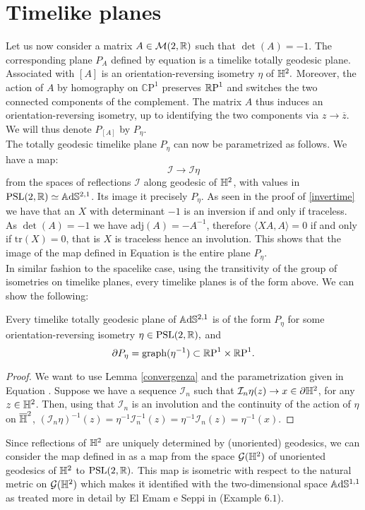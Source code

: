 \section{Timelike planes}
Let us now consider a matrix $A\in\mathcal{M}(2,\R)$ such that $\det(A)=-1.$ The corresponding plane $P_A$ defined by equation  is a timelike totally geodesic plane. Associated with $[A]$ is an orientation-reversing isometry $\eta$ of $\H^2.$ Moreover, the action of $A$ by homography on $\mathbb{C}\text{P}^1$ preserves $\S$ and switches the two connected components of the complement. The matrix $A$ thus induces an orientation-reversing isometry, up to identifying the two components via $z\to\overline{z}$. We will thus denote $P_{[A]}$ by $P_\eta$. \\
The totally geodesic timelike plane $P_\eta$ can now be parametrized as follows. We have a map: 
\begin{equation}\label{refspa}
    \mathcal{I}\to\mathcal{I}\eta
\end{equation}
from the spaces of reflections $\mathcal{I}$ along geodesic of $\H^2$, with values in $\PSL\simeq\A^{2,1}$. Its image it precisely $P_\eta.$ As seen in the proof of \ref{invertime} we have that an $X$ with determinant $-1$ is an inversion if and only if traceless. As $\det(A)=-1$ we have $\text{adj}(A)=-A^{-1}$, therefore $\langle XA,A\rangle=0$ if and only if $\text{tr}(X)=0$, that is $X$ is traceless hence an involution. This shows that the image of the map defined in Equation  is the entire plane $P_\eta$.\\  
In similar fashion to the spacelike case, using the transitivity of the group of isometries on timelike planes, every timelike planes is of the form above. We can show the following: 
\begin{lemma}\label{33}
    Every timelike totally geodesic plane of $\A^{2,1}$ is of the form $P_\eta$ for some orientation-reversing isometry $\eta\in\PSL,$ and 
    \[
        \partial P_\eta=\text{graph}(\eta^{-1})\subset\T.
    \]
\end{lemma}
\begin{proof}
    We want to use Lemma \ref{convergenza} and the parametrization given in Equation . Suppose we have a sequence $\mathcal{I}_n$ such that $\mathcal{I}_n\eta(z)\to x\in\partial\H^2$, for any $z\in\H^2$. Then, using that $\mathcal{I}_n$ is an involution and the continuity of the action of $\eta$ on $\overline{\H}^2$, $(\mathcal{I}_n\eta)^{-1}(z)=\eta^{-1}\mathcal{I}_n^{-1}(z)=\eta^{-1}\mathcal{I}_n(z)=\eta^{-1}(x).$ 
\end{proof}
\begin{observation}
    Since reflections of $\H^2$ are uniquely determined by (unoriented) geodesics, we can consider the map defined in  as a map from the space $\mathcal{G}(\H^2)$ of unoriented geodesics of $\H^2$ to $\PSL.$ This map is isometric with respect to the natural metric on $\mathcal{G}(\H^2)$ which makes it identified with the two-dimensional space $\A^{1,1}$ as treated more in detail by El Emam e Seppi in \cite{emam2022gauss} (Example $6.1$).
    \end{observation}
